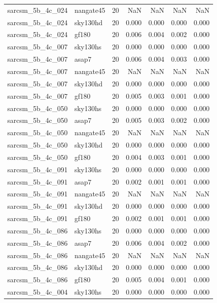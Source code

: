 \begin{tabular}{llrrrrr}
sarcsm\_5b\_4c\_024 & nangate45 & 20 & NaN & NaN & NaN & NaN \\
sarcsm\_5b\_4c\_024 & sky130hd & 20 & 0.000 & 0.000 & 0.000 & 0.000 \\
sarcsm\_5b\_4c\_024 & gf180 & 20 & 0.006 & 0.004 & 0.002 & 0.000 \\
sarcsm\_5b\_4c\_007 & sky130hs & 20 & 0.000 & 0.000 & 0.000 & 0.000 \\
sarcsm\_5b\_4c\_007 & asap7 & 20 & 0.006 & 0.004 & 0.003 & 0.000 \\
sarcsm\_5b\_4c\_007 & nangate45 & 20 & NaN & NaN & NaN & NaN \\
sarcsm\_5b\_4c\_007 & sky130hd & 20 & 0.000 & 0.000 & 0.000 & 0.000 \\
sarcsm\_5b\_4c\_007 & gf180 & 20 & 0.005 & 0.003 & 0.001 & 0.000 \\
sarcsm\_5b\_4c\_050 & sky130hs & 20 & 0.000 & 0.000 & 0.000 & 0.000 \\
sarcsm\_5b\_4c\_050 & asap7 & 20 & 0.005 & 0.003 & 0.002 & 0.000 \\
sarcsm\_5b\_4c\_050 & nangate45 & 20 & NaN & NaN & NaN & NaN \\
sarcsm\_5b\_4c\_050 & sky130hd & 20 & 0.000 & 0.000 & 0.000 & 0.000 \\
sarcsm\_5b\_4c\_050 & gf180 & 20 & 0.004 & 0.003 & 0.001 & 0.000 \\
sarcsm\_5b\_4c\_091 & sky130hs & 20 & 0.000 & 0.000 & 0.000 & 0.000 \\
sarcsm\_5b\_4c\_091 & asap7 & 20 & 0.002 & 0.001 & 0.001 & 0.000 \\
sarcsm\_5b\_4c\_091 & nangate45 & 20 & NaN & NaN & NaN & NaN \\
sarcsm\_5b\_4c\_091 & sky130hd & 20 & 0.000 & 0.000 & 0.000 & 0.000 \\
sarcsm\_5b\_4c\_091 & gf180 & 20 & 0.002 & 0.001 & 0.001 & 0.000 \\
sarcsm\_5b\_4c\_086 & sky130hs & 20 & 0.000 & 0.000 & 0.000 & 0.000 \\
sarcsm\_5b\_4c\_086 & asap7 & 20 & 0.006 & 0.004 & 0.002 & 0.000 \\
sarcsm\_5b\_4c\_086 & nangate45 & 20 & NaN & NaN & NaN & NaN \\
sarcsm\_5b\_4c\_086 & sky130hd & 20 & 0.000 & 0.000 & 0.000 & 0.000 \\
sarcsm\_5b\_4c\_086 & gf180 & 20 & 0.005 & 0.004 & 0.001 & 0.000 \\
sarcsm\_5b\_4c\_004 & sky130hs & 20 & 0.000 & 0.000 & 0.000 & 0.000 \\

\end{tabular}
